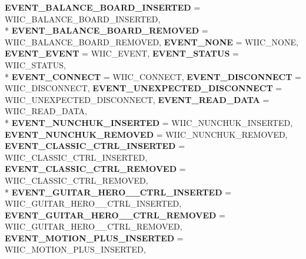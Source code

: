 \begin{DoxyCompactItemize}
{\bfseries E\-V\-E\-N\-T\-\_\-\-B\-A\-L\-A\-N\-C\-E\-\_\-\-B\-O\-A\-R\-D\-\_\-\-I\-N\-S\-E\-R\-T\-E\-D} =  W\-I\-I\-C\-\_\-\-B\-A\-L\-A\-N\-C\-E\-\_\-\-B\-O\-A\-R\-D\-\_\-\-I\-N\-S\-E\-R\-T\-E\-D, 
\\*
{\bfseries E\-V\-E\-N\-T\-\_\-\-B\-A\-L\-A\-N\-C\-E\-\_\-\-B\-O\-A\-R\-D\-\_\-\-R\-E\-M\-O\-V\-E\-D} =  W\-I\-I\-C\-\_\-\-B\-A\-L\-A\-N\-C\-E\-\_\-\-B\-O\-A\-R\-D\-\_\-\-R\-E\-M\-O\-V\-E\-D, 
{\bfseries E\-V\-E\-N\-T\-\_\-\-N\-O\-N\-E} =  W\-I\-I\-C\-\_\-\-N\-O\-N\-E, 
{\bfseries E\-V\-E\-N\-T\-\_\-\-E\-V\-E\-N\-T} =  W\-I\-I\-C\-\_\-\-E\-V\-E\-N\-T, 
{\bfseries E\-V\-E\-N\-T\-\_\-\-S\-T\-A\-T\-U\-S} =  W\-I\-I\-C\-\_\-\-S\-T\-A\-T\-U\-S, 
\\*
{\bfseries E\-V\-E\-N\-T\-\_\-\-C\-O\-N\-N\-E\-C\-T} =  W\-I\-I\-C\-\_\-\-C\-O\-N\-N\-E\-C\-T, 
{\bfseries E\-V\-E\-N\-T\-\_\-\-D\-I\-S\-C\-O\-N\-N\-E\-C\-T} =  W\-I\-I\-C\-\_\-\-D\-I\-S\-C\-O\-N\-N\-E\-C\-T, 
{\bfseries E\-V\-E\-N\-T\-\_\-\-U\-N\-E\-X\-P\-E\-C\-T\-E\-D\-\_\-\-D\-I\-S\-C\-O\-N\-N\-E\-C\-T} =  W\-I\-I\-C\-\_\-\-U\-N\-E\-X\-P\-E\-C\-T\-E\-D\-\_\-\-D\-I\-S\-C\-O\-N\-N\-E\-C\-T, 
{\bfseries E\-V\-E\-N\-T\-\_\-\-R\-E\-A\-D\-\_\-\-D\-A\-T\-A} =  W\-I\-I\-C\-\_\-\-R\-E\-A\-D\-\_\-\-D\-A\-T\-A, 
\\*
{\bfseries E\-V\-E\-N\-T\-\_\-\-N\-U\-N\-C\-H\-U\-K\-\_\-\-I\-N\-S\-E\-R\-T\-E\-D} =  W\-I\-I\-C\-\_\-\-N\-U\-N\-C\-H\-U\-K\-\_\-\-I\-N\-S\-E\-R\-T\-E\-D, 
{\bfseries E\-V\-E\-N\-T\-\_\-\-N\-U\-N\-C\-H\-U\-K\-\_\-\-R\-E\-M\-O\-V\-E\-D} =  W\-I\-I\-C\-\_\-\-N\-U\-N\-C\-H\-U\-K\-\_\-\-R\-E\-M\-O\-V\-E\-D, 
{\bfseries E\-V\-E\-N\-T\-\_\-\-C\-L\-A\-S\-S\-I\-C\-\_\-\-C\-T\-R\-L\-\_\-\-I\-N\-S\-E\-R\-T\-E\-D} =  W\-I\-I\-C\-\_\-\-C\-L\-A\-S\-S\-I\-C\-\_\-\-C\-T\-R\-L\-\_\-\-I\-N\-S\-E\-R\-T\-E\-D, 
{\bfseries E\-V\-E\-N\-T\-\_\-\-C\-L\-A\-S\-S\-I\-C\-\_\-\-C\-T\-R\-L\-\_\-\-R\-E\-M\-O\-V\-E\-D} =  W\-I\-I\-C\-\_\-\-C\-L\-A\-S\-S\-I\-C\-\_\-\-C\-T\-R\-L\-\_\-\-R\-E\-M\-O\-V\-E\-D, 
\\*
{\bfseries E\-V\-E\-N\-T\-\_\-\-G\-U\-I\-T\-A\-R\-\_\-\-H\-E\-R\-O\-\_\-\_\-\-C\-T\-R\-L\-\_\-\-I\-N\-S\-E\-R\-T\-E\-D} =  W\-I\-I\-C\-\_\-\-G\-U\-I\-T\-A\-R\-\_\-\-H\-E\-R\-O\-\_\-\_\-\-C\-T\-R\-L\-\_\-\-I\-N\-S\-E\-R\-T\-E\-D, 
{\bfseries E\-V\-E\-N\-T\-\_\-\-G\-U\-I\-T\-A\-R\-\_\-\-H\-E\-R\-O\-\_\-\_\-\-C\-T\-R\-L\-\_\-\-R\-E\-M\-O\-V\-E\-D} =  W\-I\-I\-C\-\_\-\-G\-U\-I\-T\-A\-R\-\_\-\-H\-E\-R\-O\-\_\-\_\-\-C\-T\-R\-L\-\_\-\-R\-E\-M\-O\-V\-E\-D, 
{\bfseries E\-V\-E\-N\-T\-\_\-\-M\-O\-T\-I\-O\-N\-\_\-\-P\-L\-U\-S\-\_\-\-I\-N\-S\-E\-R\-T\-E\-D} =  W\-I\-I\-C\-\_\-\-M\-O\-T\-I\-O\-N\-\_\-\-P\-L\-U\-S\-\_\-\-I\-N\-S\-E\-R\-T\-E\-D, 

\end{DoxyCompactItemize}
